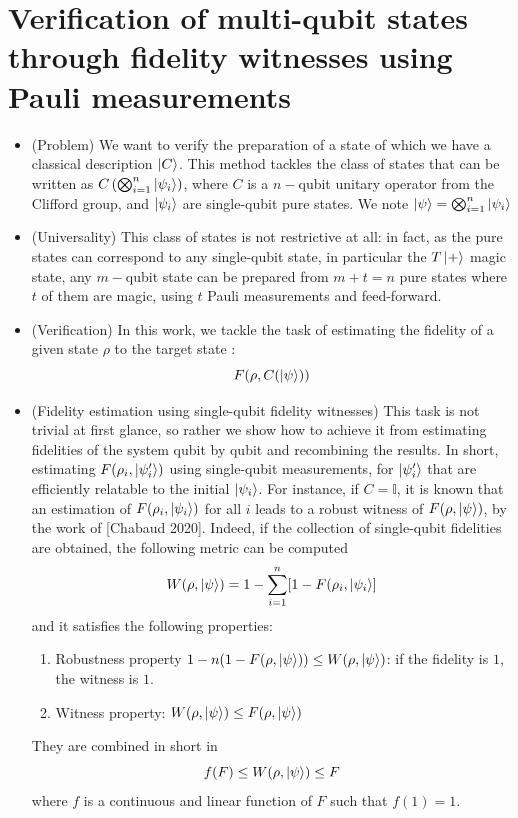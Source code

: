 \documentclass[a4paper,unpublished,onecolumn,11pt]{quantumarticle}
\begin{document}
\section{Verification of multi-qubit states through fidelity witnesses using Pauli measurements}
\begin{itemize}
    \item (Problem)
    We want to verify the preparation of a state of which we have a classical description $\ket{C}$. This method tackles the class of states that can be written as $C\left(\bigotimes_{i=1}^n\ket{\psi_i}\right)$, where $C$ is a $n-$qubit unitary operator from the Clifford group, and $\ket{\psi_i}$ are single-qubit pure states. We note $\ket\psi = \bigotimes_{i=1}^n\ket{\psi_i}$
    \item (Universality)
    This class of states is not restrictive at all: in fact, as the pure states can correspond to any single-qubit state, in particular the $T\ket +$ magic state,
    any $m-$qubit state can be prepared from $m+t=n$ pure states where $t$ of them are magic, using $t$ Pauli measurements and feed-forward.
    \item (Verification)
    In this work, we tackle the task of estimating the fidelity of a given state $\rho$ to the target state :
    \begin{equation}
        F(\rho, C(\ket\psi))
    \end{equation}
    \item (Fidelity estimation using single-qubit fidelity witnesses)
    This task is not trivial at first glance, so rather we show how to achieve it from estimating fidelities of the system qubit by qubit and recombining the results. In short, estimating $F(\rho_i,\ket{\psi'_i})$ using single-qubit measurements, for $\ket{\psi'_i}$ that are efficiently relatable to the initial $\ket{\psi_i}$. For instance, if $C=\mathbb I$, it is known that an estimation of $F(\rho_i, \ket{\psi_i})$ for all $i$ leads to a robust witness of $F(\rho, \ket\psi)$, by the work of [Chabaud 2020]. Indeed, if the collection of single-qubit fidelities are obtained, the following metric can be computed
    \begin{equation}
        \label{eq:fidelity witness}
        W(\rho, \ket\psi) = 1- \sum_{i=1}^n [1-F(\rho_i, \ket{\psi_i}]
    \end{equation}
    and it satisfies the following properties:
    \begin{enumerate}
        \item Robustness property $1-n(1-F(\rho, \ket\psi)) \leq W(\rho, \ket\psi)$: if the fidelity is $1$, the witness is $1$.
        \item Witness property: $W(\rho, \ket\psi) \leq F(\rho, \ket\psi)$
    \end{enumerate}
    They are combined in short in
    \begin{equation}
        \label{eq: robust fidelity witness}
        f(F) \leq W(\rho, \ket\psi) \leq F
    \end{equation}
    where $f$ is a continuous and linear function of $F$ such that $f(1)=1$.


\end{itemize}
\end{document}
